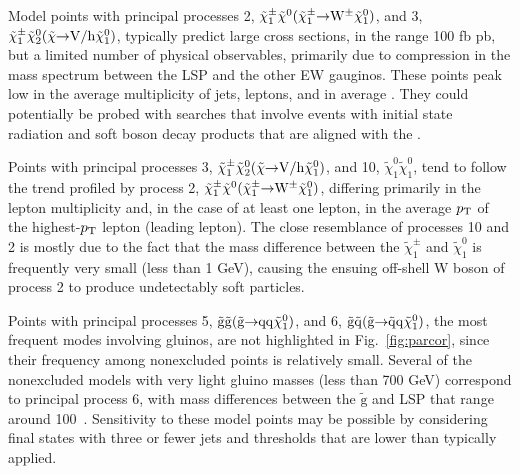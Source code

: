 Model points with principal processes 2, $\tilde{\chi}^{\pm}_{1}\tilde{\chi}^{0}(\tilde{\chi}^{\pm}_{1} \hspace{-1mm}\rightarrow \hspace{-1mm}{\rm W}^{\pm}\tilde{\chi}_{1}^{0})$, and 3, $\tilde{\chi}^{\pm}_{1}\tilde{\chi}^{0}_{2}(\tilde{\chi} \hspace{-1mm}\rightarrow \hspace{-1mm}{\rm V/h}\tilde{\chi}_{1}^{0})$, typically predict large cross sections, in the range 100 fb pb, 
but a limited number of physical observables, primarily due to compression in the mass spectrum between the LSP and the other EW gauginos. These points peak low in the average multiplicity of jets, leptons, and in average \MET{}. They could potentially be probed with searches that involve events with initial state radiation and soft boson decay products that are aligned with the \MET{}.

Points with principal processes 3, $\tilde{\chi}^{\pm}_{1}\tilde{\chi}^{0}_{2}(\tilde{\chi} \hspace{-1mm}\rightarrow \hspace{-1mm}{\rm V/h}\tilde{\chi}_{1}^{0})$, and 10, $\tilde{\chi}^{0}_{1}\tilde{\chi}^{0}_{1}$, tend to follow the trend profiled
by process 2, $\tilde{\chi}^{\pm}_{1}\tilde{\chi}^{0}(\tilde{\chi}^{\pm}_{1} \hspace{-1mm}\rightarrow \hspace{-1mm}{\rm W}^{\pm}\tilde{\chi}_{1}^{0})$, differing primarily in the lepton multiplicity and, in the case of at least one lepton, in the average $p_{\text{T}}$ of the highest-$p_{\text{T}}$ lepton (leading lepton). The close resemblance of
processes 10 and 2  is mostly due to the fact that the mass
difference between the $\tilde{\chi}_{1}^\pm$ and
$\tilde{\chi}_1^0$ is frequently very small (less than 1 GeV), causing the ensuing off-shell W 
boson of process 2 to produce undetectably soft particles.

Points with principal processes 5, $\tilde{\rm g}\tilde{\rm g}(\tilde{\rm g} \hspace{-1mm}\rightarrow \hspace{-1mm}{\rm qq}\tilde{\chi}_{1}^{0})$, and 6, $\tilde{\rm g}\tilde{\rm q}(\tilde{\rm g} \hspace{-1mm}\rightarrow \hspace{-1mm}\tilde{\rm q}{\rm q}\tilde{\chi}_{1}^{0})$, the most frequent modes
involving gluinos, are not highlighted in Fig.~\ref{fig:parcor}, since their frequency among nonexcluded points is relatively small. Several of the nonexcluded models with very light gluino masses (less than 700 GeV) correspond to principal process 6, with mass differences between the $\tilde{\text{g}}$ and LSP that range around 100~\GeV. Sensitivity to these model points may be possible by considering final states with three or fewer jets and \MET{} thresholds that are lower than typically applied.

